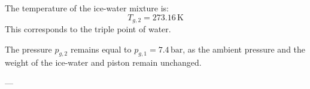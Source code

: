 The temperature of the ice-water mixture is:  
\[
T_{g,2} = 273.16 \, \text{K}
\]  
This corresponds to the triple point of water.  

The pressure \( p_{g,2} \) remains equal to \( p_{g,1} = 7.4 \, \text{bar} \), as the ambient pressure and the weight of the ice-water and piston remain unchanged.  

---